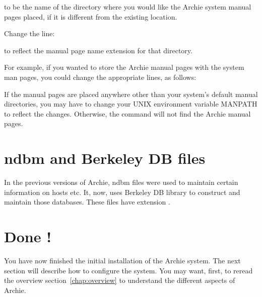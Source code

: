 
to be the name of the directory where you would like the Archie system
manual pages placed, if it is different from the existing location.

Change the line:


to reflect the manual page name extension for that directory.

For example, if you wanted to store the Archie manual pages with the system
man pages, you could change the appropriate lines, as follows:





If the manual pages are placed anywhere other than your system's default manual
directories, you may have to change your UNIX environment variable MANPATH to
reflect the changes. Otherwise, the  command will not find the Archie
manual pages.



\section{ndbm and Berkeley DB files}
\label{ndbm}
\new

In the previous versions of Archie, ndbm files were used to maintain certain
information on hosts etc. It, now, uses Berkeley DB library to construct and
maintain those databases.  These files have extension .

%
%

\section{Done !}

You have now finished the initial installation of the Archie system. The next
section  will describe how to configure the system. You may want, first,
to reread the overview section~\ref{chap:overview} to understand the different
aspects of Archie.






